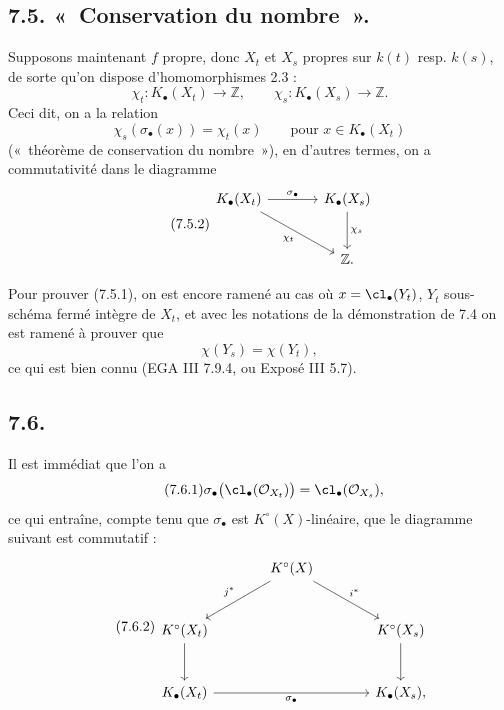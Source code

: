 \subsection*{7.5. «~Conservation du nombre~».}
Supposons maintenant \(f\) propre, donc \(X_t\) et \(X_s\) propres sur \(k(t)\) resp. \(k(s)\), de sorte qu'on dispose d'homomorphismes 2.3 :
\[
  \chi_t:K_\bullet(X_t)\longrightarrow \mathbb Z,\qquad
  \chi_s:K_\bullet(X_s)\longrightarrow \mathbb Z .
\]
Ceci dit, on a la relation
\begin{equation}\tag{7.5.1}
  \chi_s(\sigma_\bullet(x))=\chi_t(x)\qquad\text{pour } x\in K_\bullet(X_t)
\end{equation}
(«~théorème de conservation du nombre~»), en d'autres termes, on a commutativité dans le diagramme
\begin{equation}\tag{7.5.2}
\begin{tikzcd}[column sep=large,row sep=large]
K_\bullet(X_t) \arrow[r,"\sigma_\bullet"] \arrow[dr,"\chi_t"'] &
K_\bullet(X_s) \arrow[d,"\chi_s"]\\
& \mathbb Z .
\end{tikzcd}
\end{equation}

Pour prouver (7.5.1), on est encore ramené au cas où \(x=\cl_\bullet(Y_t)\), \(Y_t\) sous-schéma fermé intègre de \(X_t\), et avec les notations de la démonstration de 7.4 on est ramené à prouver que
\[
  \chi(Y_s)=\chi(Y_t),
\]
ce qui est bien connu (EGA III 7.9.4, ou Exposé III 5.7).

\subsection*{7.6.}
Il est immédiat que l'on a
\begin{equation}\tag{7.6.1}
  \sigma_\bullet\bigl(\cl_\bullet(\mathcal O_{X_t})\bigr)=\cl_\bullet(\mathcal O_{X_s}),
\end{equation}
ce qui entraîne, compte tenu que \(\sigma_\bullet\) est \(K^\circ(X)\)-linéaire, que le diagramme suivant est commutatif :
\begin{equation}\tag{7.6.2}
\begin{tikzcd}[column sep=large,row sep=large]
& K^\circ(X) \arrow[dl,"j^*"'] \arrow[dr,"i^*"] &\\
K^\circ(X_t) \arrow[d] && K^\circ(X_s) \arrow[d]\\
K_\bullet(X_t) \arrow[rr,"\sigma_\bullet"'] && K_\bullet(X_s),
\end{tikzcd}
\end{equation}
